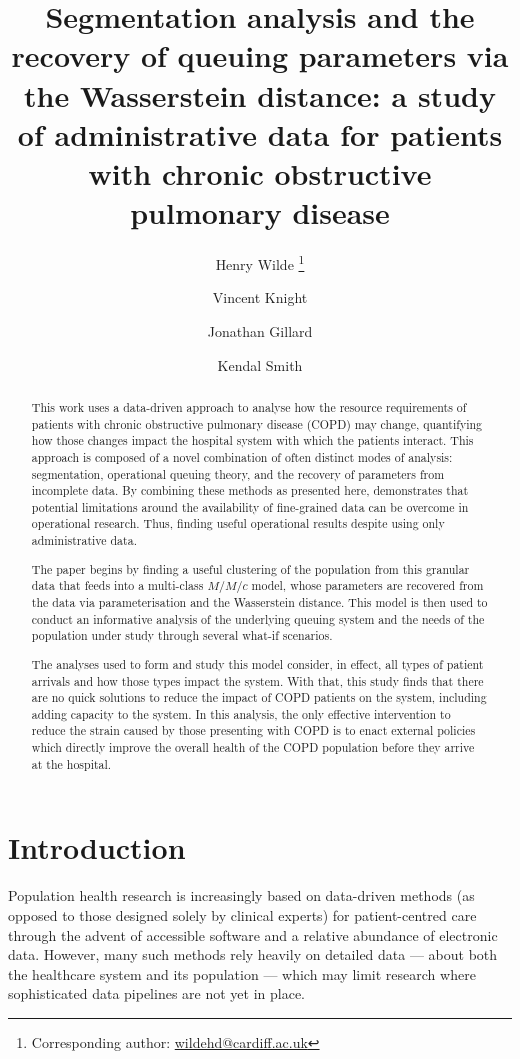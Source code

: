 \documentclass[11pt]{article}
\title{%
    Segmentation analysis and the recovery of queuing parameters via the
    Wasserstein distance: a study of administrative data for patients with
    chronic obstructive pulmonary disease
}
\author[a]{%
    Henry Wilde \footnote{Corresponding author: \url{wildehd@cardiff.ac.uk}}%
}
\author[a]{Vincent Knight}
\author[a]{Jonathan Gillard}
\author[b]{Kendal Smith}
\affil[a]{School of Mathematics, Cardiff University}
\affil[b]{Cwm Taf Morgannwg University Health Board}
\date{}
\begin{document}
\maketitle%

\begin{abstract}
    This work uses a data-driven approach to analyse how the resource
    requirements of patients with chronic obstructive pulmonary disease (COPD)
    may change, quantifying how those changes impact the hospital system with
    which the patients interact. This approach is composed of a novel
    combination of often distinct modes of analysis: segmentation, operational
    queuing theory, and the recovery of parameters from incomplete data. By
    combining these methods as presented here, demonstrates that potential
    limitations around the availability of fine-grained data can be overcome in
    operational research. Thus, finding useful operational results despite using
    only administrative data. 

    The paper begins by finding a useful clustering of the population from this
    granular data that feeds into a multi-class \(M/M/c\) model, whose
    parameters are recovered from the data via parameterisation and the
    Wasserstein distance. This model is then used to conduct an informative
    analysis of the underlying queuing system and the needs of the population
    under study through several what-if scenarios.

    The analyses used to form and study this model consider, in effect, all
    types of patient arrivals and how those types impact the system. With that,
    this study finds that there are no quick solutions to reduce the impact of
    COPD patients on the system, including adding capacity to the system. In
    this analysis, the only effective intervention to reduce the strain caused
    by those presenting with COPD is to enact external policies which directly
    improve the overall health of the COPD population before they arrive at the
    hospital.
\end{abstract}


\section{Introduction}\label{sec:intro}

Population health research is increasingly based on data-driven methods (as
opposed to those designed solely by clinical experts) for patient-centred care
through the advent of accessible software and a relative abundance of electronic
data. However, many such methods rely heavily on detailed data — about both the
healthcare system and its population — which may limit research where
sophisticated data pipelines are not yet in place.
\end{document}
